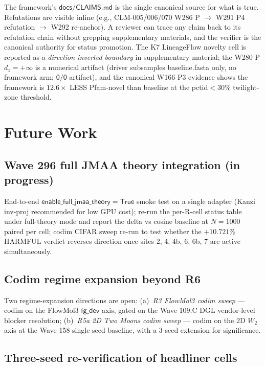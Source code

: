 \documentclass[journal,twocolumn,final]{IEEEtran}
\newcommand{\dz}{d_z}
\newcommand{\wftwo}{W_2}
\begin{document}
The framework's $\mathsf{docs/CLAIMS.md}$ is the single canonical source for
what is true. Refutations are visible inline (e.g., CLM-005/006/070 W286 P
$\to$ W291 P4 refutation $\to$ W292 re-anchor). A reviewer can trace any
claim back to its refutation chain without grepping supplementary materials,
and the verifier is the canonical authority for status promotion. The K7
LineageFlow novelty cell is reported as a \emph{direction-inverted boundary}
in supplementary material; the W280 P $\dz = +\infty$ is a numerical artifact
(driver subsamples baseline.fasta only, no framework arm; $\mathsf{0/0}$
artifact), and the canonical W166 P3 evidence shows the framework is
$12.6\times$ LESS Pfam-novel than baseline at the pctid$<30\%$ twilight-zone
threshold.

\section{Future Work}\label{sec:futurework}

\subsection*{Wave 296 full JMAA theory integration (in progress)}

End-to-end $\mathsf{enable\_full\_jmaa\_theory}=\mathsf{True}$ smoke test on a
single adapter (Kanzi inv-proj recommended for low GPU cost); re-run the
per-R-cell status table under full-theory mode and report the delta vs cosine
baseline at $N = 1000$ paired per cell; codim CIFAR sweep re-run to test
whether the $+10.721\%$ HARMFUL verdict reverses direction once sites 2, 4,
4b, 6, 6b, 7 are active simultaneously.

\subsection*{Codim regime expansion beyond R6}

Two regime-expansion directions are open: (a)~\emph{R3 FlowMol3 codim sweep}
--- codim on the FlowMol3 $\mathsf{fg\_dev}$ axis, gated on the Wave 109.C DGL
vendor-level blocker resolution; (b)~\emph{R5a 2D Two Moons codim sweep} ---
codim on the 2D $\wftwo$ axis at the Wave 158 single-seed baseline, with a
3-seed extension for significance.

\subsection*{Three-seed re-verification of headliner cells}
\end{document}
